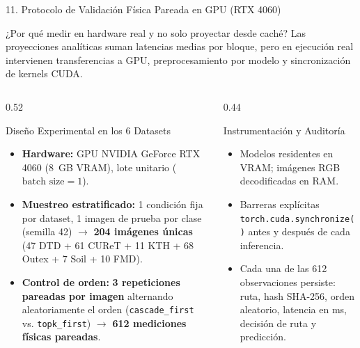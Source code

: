 \documentclass[aspectratio=169,10pt]{beamer}
\begin{document}
\begin{frame}{11. Protocolo de Validación Física Pareada en GPU (RTX 4060)}
\begin{block}{¿Por qué medir en hardware real y no solo proyectar desde caché?}
Las proyecciones analíticas suman latencias medias por bloque, pero en ejecución real intervienen transferencias a GPU, preprocesamiento por modelo y sincronización de kernels CUDA.
\end{block}

\begin{columns}[T]
\begin{column}{0.52\textwidth}
\begin{exampleblock}{Diseño Experimental en los 6 Datasets}
\begin{itemize}
\item \textbf{Hardware:} GPU NVIDIA GeForce RTX 4060 (8~GB VRAM), lote unitario ($\text{batch size} = 1$).
\item \textbf{Muestreo estratificado:} 1 condición fija por dataset, 1 imagen de prueba por clase (semilla 42) $\rightarrow$ \textbf{204 imágenes únicas} (47 DTD + 61 CUReT + 11 KTH + 68 Outex + 7 Soil + 10 FMD).
\item \textbf{Control de orden:} \textbf{3 repeticiones pareadas por imagen} alternando aleatoriamente el orden (\texttt{cascade\_first} vs. \texttt{topk\_first}) $\rightarrow$ \textbf{612 mediciones físicas pareadas}.
\end{itemize}
\end{exampleblock}
\end{column}
\begin{column}{0.44\textwidth}
\begin{block}{Instrumentación y Auditoría}
\begin{itemize}
\item Modelos residentes en VRAM; imágenes RGB decodificadas en RAM.
\item Barreras explícitas \texttt{torch.cuda.synchronize()} antes y después de cada inferencia.
\item Cada una de las 612 observaciones persiste: ruta, hash SHA-256, orden aleatorio, latencia en ms, decisión de ruta y predicción.
\end{itemize}
\end{block}
\end{column}
\end{columns}
\end{frame}
\end{document}
